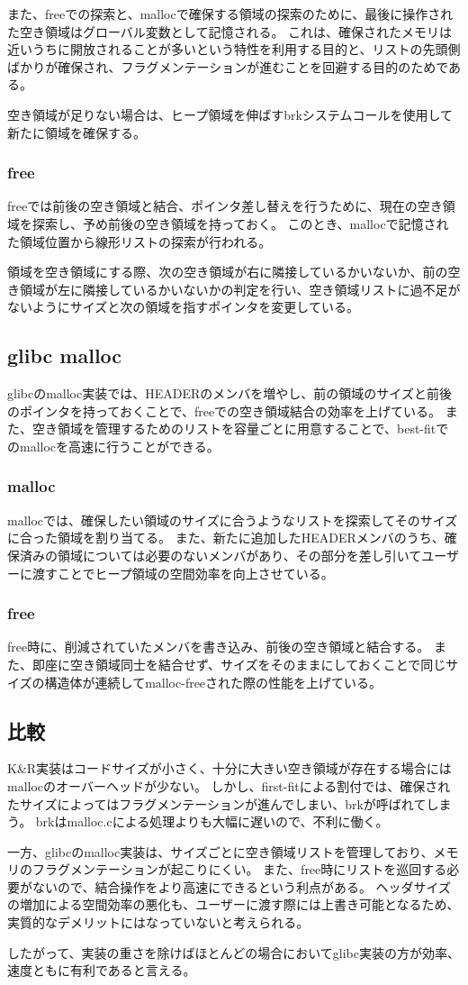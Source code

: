 \documentclass[a4paper,10pt]{jsarticle}
\begin{document}
また、freeでの探索と、mallocで確保する領域の探索のために、最後に操作された空き領域はグローバル変数として記憶される。
これは、確保されたメモリは近いうちに開放されることが多いという特性を利用する目的と、リストの先頭側ばかりが確保され、フラグメンテーションが進むことを回避する目的のためである。

空き領域が足りない場合は、ヒープ領域を伸ばすbrkシステムコールを使用して新たに領域を確保する。

\subsubsection{free}
freeでは前後の空き領域と結合、ポインタ差し替えを行うために、現在の空き領域を探索し、予め前後の空き領域を持っておく。
このとき、mallocで記憶された領域位置から線形リストの探索が行われる。

領域を空き領域にする際、次の空き領域が右に隣接しているかいないか、前の空き領域が左に隣接しているかいないかの判定を行い、空き領域リストに過不足がないようにサイズと次の領域を指すポインタを変更している。

\subsection{glibc malloc}
glibcのmalloc実装では、HEADERのメンバを増やし、前の領域のサイズと前後のポインタを持っておくことで、freeでの空き領域結合の効率を上げている。
また、空き領域を管理するためのリストを容量ごとに用意することで、best-fitでのmallocを高速に行うことができる。

\subsubsection{malloc}
mallocでは、確保したい領域のサイズに合うようなリストを探索してそのサイズに合った領域を割り当てる。
また、新たに追加したHEADERメンバのうち、確保済みの領域については必要のないメンバがあり、その部分を差し引いてユーザーに渡すことでヒープ領域の空間効率を向上させている。

\subsubsection{free}
free時に、削減されていたメンバを書き込み、前後の空き領域と結合する。
また、即座に空き領域同士を結合せず、サイズをそのままにしておくことで同じサイズの構造体が連続してmalloc-freeされた際の性能を上げている。

\subsection{比較}
K\&R実装はコードサイズが小さく、十分に大きい空き領域が存在する場合にはmallocのオーバーヘッドが少ない。
しかし、first-fitによる割付では、確保されたサイズによってはフラグメンテーションが進んでしまい、brkが呼ばれてしまう。
brkはmalloc.cによる処理よりも大幅に遅いので、不利に働く。

一方、glibcのmalloc実装は、サイズごとに空き領域リストを管理しており、メモリのフラグメンテーションが起こりにくい。
また、free時にリストを巡回する必要がないので、結合操作をより高速にできるという利点がある。
ヘッダサイズの増加による空間効率の悪化も、ユーザーに渡す際には上書き可能となるため、実質的なデメリットにはなっていないと考えられる。

したがって、実装の重さを除けばほとんどの場合においてglibc実装の方が効率、速度ともに有利であると言える。
\end{document}
